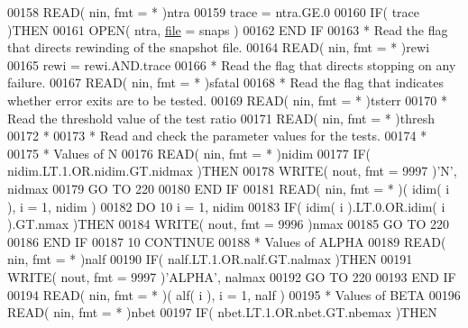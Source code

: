 \begin{DoxyCode}
00158       \textcolor{keyword}{READ}( nin, fmt = * )ntra
00159       trace = ntra.GE.0
00160       \textcolor{keywordflow}{IF}( trace )\textcolor{keywordflow}{THEN}
00161          \textcolor{keyword}{OPEN}( ntra, \hyperlink{structfile}{file} = snaps )
00162 \textcolor{keywordflow}{      END IF}
00163 \textcolor{comment}{*     Read the flag that directs rewinding of the snapshot file.}
00164       \textcolor{keyword}{READ}( nin, fmt = * )rewi
00165       rewi = rewi.AND.trace
00166 \textcolor{comment}{*     Read the flag that directs stopping on any failure.}
00167       \textcolor{keyword}{READ}( nin, fmt = * )sfatal
00168 \textcolor{comment}{*     Read the flag that indicates whether error exits are to be tested.}
00169       \textcolor{keyword}{READ}( nin, fmt = * )tsterr
00170 \textcolor{comment}{*     Read the threshold value of the test ratio}
00171       \textcolor{keyword}{READ}( nin, fmt = * )thresh
00172 \textcolor{comment}{*}
00173 \textcolor{comment}{*     Read and check the parameter values for the tests.}
00174 \textcolor{comment}{*}
00175 \textcolor{comment}{*     Values of N}
00176       \textcolor{keyword}{READ}( nin, fmt = * )nidim
00177       \textcolor{keywordflow}{IF}( nidim.LT.1.OR.nidim.GT.nidmax )\textcolor{keywordflow}{THEN}
00178          \textcolor{keyword}{WRITE}( nout, fmt = 9997 )\textcolor{stringliteral}{'N'}, nidmax
00179          \textcolor{keywordflow}{GO TO} 220
00180 \textcolor{keywordflow}{      END IF}
00181       \textcolor{keyword}{READ}( nin, fmt = * )( idim( i ), i = 1, nidim )
00182       \textcolor{keywordflow}{DO} 10 i = 1, nidim
00183          \textcolor{keywordflow}{IF}( idim( i ).LT.0.OR.idim( i ).GT.nmax )\textcolor{keywordflow}{THEN}
00184             \textcolor{keyword}{WRITE}( nout, fmt = 9996 )nmax
00185             \textcolor{keywordflow}{GO TO} 220
00186 \textcolor{keywordflow}{         END IF}
00187    10 \textcolor{keywordflow}{CONTINUE}
00188 \textcolor{comment}{*     Values of ALPHA}
00189       \textcolor{keyword}{READ}( nin, fmt = * )nalf
00190       \textcolor{keywordflow}{IF}( nalf.LT.1.OR.nalf.GT.nalmax )\textcolor{keywordflow}{THEN}
00191          \textcolor{keyword}{WRITE}( nout, fmt = 9997 )\textcolor{stringliteral}{'ALPHA'}, nalmax
00192          \textcolor{keywordflow}{GO TO} 220
00193 \textcolor{keywordflow}{      END IF}
00194       \textcolor{keyword}{READ}( nin, fmt = * )( alf( i ), i = 1, nalf )
00195 \textcolor{comment}{*     Values of BETA}
00196       \textcolor{keyword}{READ}( nin, fmt = * )nbet
00197       \textcolor{keywordflow}{IF}( nbet.LT.1.OR.nbet.GT.nbemax )\textcolor{keywordflow}{THEN}

\end{DoxyCode}
